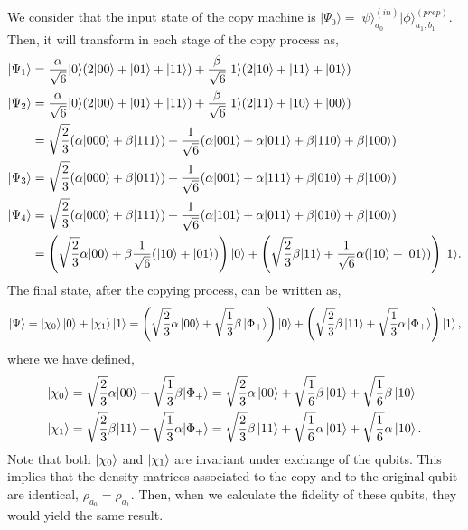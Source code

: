 We consider that the input state of the copy machine is $|\Psi_0\rangle = |\psi\rangle^{(in)}_{a_0}|\phi\rangle^{(prep)}_{a_1,b_1}$. Then, it will transform in each stage of the copy process as,
\begin{align}
|\Psi_1\rangle &= \frac{\alpha}{\sqrt{6}}|0\rangle(2|00\rangle +|01\rangle + |11\rangle) + \frac{\beta}{\sqrt{6}}|1\rangle(2|10\rangle +|11\rangle + |01\rangle)\notag \\
|\Psi_2\rangle &= \frac{\alpha}{\sqrt{6}}|0\rangle(2|00\rangle +|01\rangle + |11\rangle) + \frac{\beta}{\sqrt{6}}|1\rangle(2|11\rangle +|10\rangle + |00\rangle)\notag \\
&= \sqrt{\frac{2}{3}}(\alpha|000\rangle+\beta|111\rangle) + \frac{1}{\sqrt{6}}(\alpha|001\rangle +\alpha|011\rangle + \beta|110\rangle + \beta |100\rangle)\notag \\
|\Psi_3\rangle &= \sqrt{\frac{2}{3}}(\alpha|000\rangle+\beta|011\rangle) + \frac{1}{\sqrt{6}}(\alpha|001\rangle +\alpha|111\rangle + \beta|010\rangle + \beta |100\rangle)\notag \\
|\Psi_4\rangle &= \sqrt{\frac{2}{3}}(\alpha|000\rangle+\beta|111\rangle) + \frac{1}{\sqrt{6}}(\alpha|101\rangle +\alpha|011\rangle + \beta|010\rangle + \beta |100\rangle)\notag \\
&=\left( \sqrt{\frac{2}{3}}\alpha|00\rangle +\beta \frac{1}{\sqrt{6}}(|10\rangle+|01\rangle)\right)|0\rangle  + \left( \sqrt{\frac{2}{3}}\beta|11\rangle + \frac{1}{\sqrt{6}}\alpha(|10\rangle + |01\rangle )\right)|1\rangle.\notag
\end{align}
The final state, after the copying process, can be written as,
\begin{equation}
\ket{\Psi}=\ket{\chi_0}\ket{0}+\ket{\chi_1}\ket{1}=\left(\sqrt{\frac{2}{3}}\alpha\ket{00}+\sqrt{\frac{1}{3}}\beta\ket{\Phi_+}\right)\ket{0}+\left(\sqrt{\frac{2}{3}}\beta\ket{11}+\sqrt{\frac{1}{3}}\alpha\ket{\Phi_+}\right)\ket{1},
\end{equation}
where we have defined,
\begin{align}
|\chi_0\rangle &= \sqrt{\frac{2}{3}}\alpha|00\rangle + \sqrt{\frac{1}{3}}\beta|\Phi_+\rangle=\sqrt{\frac{2}{3}}\alpha\ket{00}+\sqrt{\frac{1}{6}}\beta\ket{01}+\sqrt{\frac{1}{6}}\beta\ket{10}\\
|\chi_1\rangle &= \sqrt{\frac{2}{3}}\beta|11\rangle +\sqrt{\frac{1}{3}}\alpha |\Phi_+\rangle=\sqrt{\frac{2}{3}}\beta\ket{11}+\sqrt{\frac{1}{6}}\alpha\ket{01}+\sqrt{\frac{1}{6}}\alpha\ket{10}.
\end{align}
Note that both $\ket{\chi_0}$ and $\ket{\chi_1}$ are invariant under exchange of the qubits. This implies that the density matrices associated to the copy and to the original qubit are identical, $\rho_{a_0}=\rho_{a_1}$. Then, when we calculate the fidelity of these qubits, they would yield the same result.

